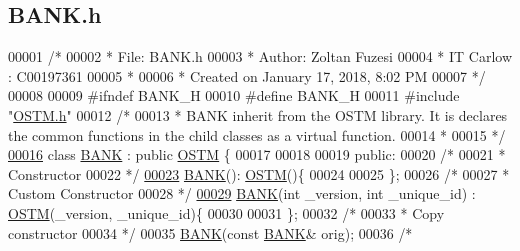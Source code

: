 \hypertarget{_b_a_n_k_8h_source}{}\subsection{B\+A\+N\+K.\+h}

\begin{DoxyCode}
00001 \textcolor{comment}{/* }
00002 \textcolor{comment}{ * File:   BANK.h}
00003 \textcolor{comment}{ * Author: Zoltan Fuzesi}
00004 \textcolor{comment}{ * IT Carlow : C00197361}
00005 \textcolor{comment}{ *}
00006 \textcolor{comment}{ * Created on January 17, 2018, 8:02 PM}
00007 \textcolor{comment}{ */}
00008 
00009 \textcolor{preprocessor}{#ifndef BANK\_H}
00010 \textcolor{preprocessor}{#define BANK\_H}
00011 \textcolor{preprocessor}{#include "\hyperlink{_o_s_t_m_8h}{OSTM.h}"}
00012 \textcolor{comment}{/*}
00013 \textcolor{comment}{ * BANK inherit from the OSTM library. It is declares the common functions in the child classes as a
       virtual  function.}
00014 \textcolor{comment}{ * }
00015 \textcolor{comment}{ */}
\hypertarget{_b_a_n_k_8h_source.tex_l00016}{}\hyperlink{class_b_a_n_k}{00016} \textcolor{keyword}{class }\hyperlink{class_b_a_n_k}{BANK} : \textcolor{keyword}{public} \hyperlink{class_o_s_t_m}{OSTM} \{
00017 
00018     
00019 \textcolor{keyword}{public}:
00020     \textcolor{comment}{/*}
00021 \textcolor{comment}{     * Constructor}
00022 \textcolor{comment}{     */}
\hypertarget{_b_a_n_k_8h_source.tex_l00023}{}\hyperlink{class_b_a_n_k_a0bc938356cebff14fb0560264abe5a34_a0bc938356cebff14fb0560264abe5a34}{00023}     \hyperlink{class_b_a_n_k_a0bc938356cebff14fb0560264abe5a34_a0bc938356cebff14fb0560264abe5a34}{BANK}(): \hyperlink{class_o_s_t_m}{OSTM}()\{
00024         
00025     \};
00026     \textcolor{comment}{/*}
00027 \textcolor{comment}{     * Custom Constructor}
00028 \textcolor{comment}{     */}
\hypertarget{_b_a_n_k_8h_source.tex_l00029}{}\hyperlink{class_b_a_n_k_a7382dd275d8f4f10a8b53ccbc93e1e87_a7382dd275d8f4f10a8b53ccbc93e1e87}{00029}     \hyperlink{class_b_a_n_k_a7382dd275d8f4f10a8b53ccbc93e1e87_a7382dd275d8f4f10a8b53ccbc93e1e87}{BANK}(\textcolor{keywordtype}{int} \_version, \textcolor{keywordtype}{int} \_unique\_id) : \hyperlink{class_o_s_t_m}{OSTM}(\_version, \_unique\_id)\{
00030         
00031     \};
00032     \textcolor{comment}{/*}
00033 \textcolor{comment}{     * Copy constructor}
00034 \textcolor{comment}{     */}
00035     \hyperlink{class_b_a_n_k_a0bc938356cebff14fb0560264abe5a34_a0bc938356cebff14fb0560264abe5a34}{BANK}(\textcolor{keyword}{const} \hyperlink{class_b_a_n_k}{BANK}& orig);
00036     \textcolor{comment}{/*}

\end{DoxyCode}
